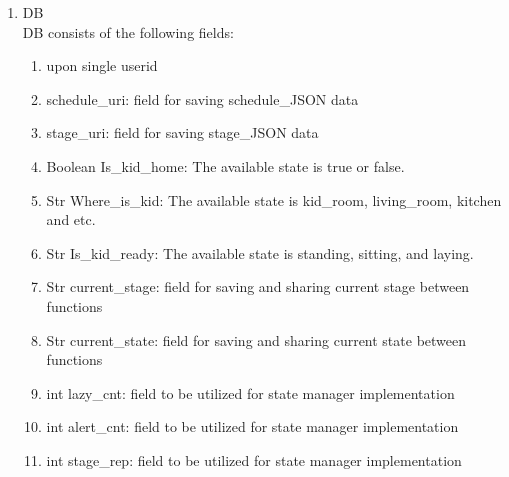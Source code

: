 \documentclass[conference]{IEEEtran}
\begin{document}
\begin{enumerate}[label=\arabic*.]
\begin{enumerate}[label=\arabic*.]
\begin{enumerate}[label=\alph*.]
\begin{enumerate}[label=\roman*.]
        \end{enumerate}
    \end{enumerate}      
    \item {\large{DB}} \\
    DB consists of the following fields: \\
    \begin{enumerate}[label=\alph*.]
        \item {\large{upon single userid}} 
        \item {\large{schedule\_uri: field for saving schedule\_JSON data}} 
        \item {\large{stage\_uri: field for saving stage\_JSON data}} 
        \item {\large{Boolean Is\_kid\_home: The available state is true or false.}} 
        \item {\large{Str Where\_is\_kid: The available state is kid\_room, living\_room, kitchen and etc. }} 
        \item {\large{Str Is\_kid\_ready: The available state is standing, sitting, and laying. }}
        \item {\large{Str current\_stage: field for saving and sharing current stage between functions}}
        \item {\large{Str current\_state: field for saving and sharing current state between functions}}
        \item {\large{int lazy\_cnt: field to be utilized for state manager implementation}}
        \item {\large{int alert\_cnt: field to be utilized for state manager implementation}}
        \item {\large{int stage\_rep: field to be utilized for state manager implementation}} \\   
    \end{enumerate}
\end{enumerate}
\newpage


\end{enumerate}
\end{document}
